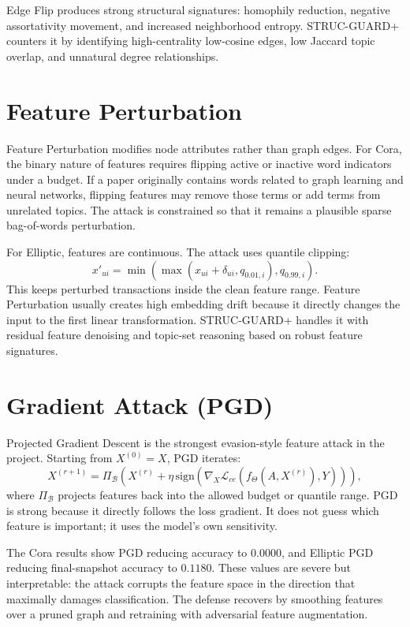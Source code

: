 \documentclass[12pt,oneside]{report}
\begin{document}
Edge Flip produces strong structural signatures: homophily reduction, negative assortativity movement, and increased neighborhood entropy. STRUC-GUARD+ counters it by identifying high-centrality low-cosine edges, low Jaccard topic overlap, and unnatural degree relationships.

\section{Feature Perturbation}
Feature Perturbation modifies node attributes rather than graph edges. For Cora, the binary nature of features requires flipping active or inactive word indicators under a budget. If a paper originally contains words related to graph learning and neural networks, flipping features may remove those terms or add terms from unrelated topics. The attack is constrained so that it remains a plausible sparse bag-of-words perturbation.

For Elliptic, features are continuous. The attack uses quantile clipping:
$$
x'_{ui}=\min(\max(x_{ui}+\delta_{ui},q_{0.01,i}),q_{0.99,i}).
$$
This keeps perturbed transactions inside the clean feature range. Feature Perturbation usually creates high embedding drift because it directly changes the input to the first linear transformation. STRUC-GUARD+ handles it with residual feature denoising and topic-set reasoning based on robust feature signatures.

\section{Gradient Attack (PGD)}
Projected Gradient Descent is the strongest evasion-style feature attack in the project. Starting from $X^{(0)}=X$, PGD iterates:
$$
X^{(r+1)}=\Pi_{\mathcal{B}}\left(X^{(r)}+\eta\,\text{sign}\left(\nabla_X\mathcal{L}_{ce}(f_{\Theta}(A,X^{(r)}),Y)\right)\right),
$$
where $\Pi_{\mathcal{B}}$ projects features back into the allowed budget or quantile range. PGD is strong because it directly follows the loss gradient. It does not guess which feature is important; it uses the model's own sensitivity.

The Cora results show PGD reducing accuracy to $0.0000$, and Elliptic PGD reducing final-snapshot accuracy to $0.1180$. These values are severe but interpretable: the attack corrupts the feature space in the direction that maximally damages classification. The defense recovers by smoothing features over a pruned graph and retraining with adversarial feature augmentation.
\end{document}
